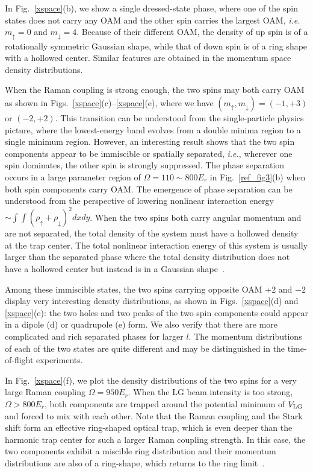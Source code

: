 \documentclass[twocolumn,pra,unsortedaddress,showpacs,floatfix,citeautoscript,nofootinbib]{revtex4-1}
\begin{document}
In Fig.~\ref{xspace}(b), we show a single dressed-state phase,
where one of the spin states does not carry any OAM and the other
spin carries the largest OAM, \emph{i.e.}~$m_{\uparrow }=0$ and
$m_{\downarrow }=4$. Because of their different OAM, the density
of up spin is of a rotationally symmetric Gaussian shape, while
that of down spin is of a ring shape with a hollowed center.
Similar features are obtained in the momentum space density
distributions.

When the Raman coupling is strong enough, the two spins may both
carry OAM as shown in Figs.~\ref{xspace}(c)--\ref{xspace}(e),
where we have $(m_{\uparrow },m_{\downarrow })=(-1,+3)$ or
$(-2,+2)$. This transition can be understood from the
single-particle physics picture, where the lowest-energy band
evolves from a double minima region to a single minimum region.
However, an interesting result shows that the two spin components
appear to be immiscible or spatially separated, \emph{i.e.},
wherever one spin dominates, the other spin is strongly
suppressed. The phase separation occurs in a large parameter
region of $\Omega = 110 \sim 800 E_{r}$ in Fig.~\ref{ref_fig3}(b)
when both spin components carry OAM. The emergence of phase
separation can
be understood from the perspective of lowering nonlinear interaction energy $%
\sim \int \int (\rho _{\uparrow }+\rho _{\downarrow })^{2}dxdy$.
When the two spins both carry angular momentum and are not
separated, the total density of the system must have a hollowed
density at the trap center. The total nonlinear interaction energy
of this system is usually larger than the separated phase where
the total density distribution does not have a hollowed center but
instead is in a Gaussian shape~\cite{Ho1996,Ueda}.

Among these immiscible states, the two spins carrying opposite OAM
$+2$ and $-2$ display very interesting density distributions, as
shown in Figs.~\ref{xspace}(d) and \ref{xspace}(e): the two holes
and two peaks of the two spin components could appear in a dipole
(d) or quadrupole (e) form. We also verify that there are more
complicated and rich separated phases for larger $l$. The momentum
distributions of each of the two states are quite different and
may be distinguished in the time-of-flight experiments.



In Fig.~\ref{xspace}(f), we plot the density distributions of the
two spins for a very large Raman coupling $\Omega =950E_{r}$. When
the LG beam intensity is too strong, $\Omega > 800 E_r$, both
components are trapped around the potential minimum of
$V_{\rm{LG}}$ and forced to mix with each other. Note that the
Raman coupling and the Stark shift form an effective ring-shaped
optical trap, which is even deeper than the harmonic trap center
for such a larger Raman coupling strength. In this case, the two
components exhibit a miscible ring distribution and their momentum
distributions are also of a ring-shape, which returns to the ring
limit~\cite{Sun2014}.
\end{document}
